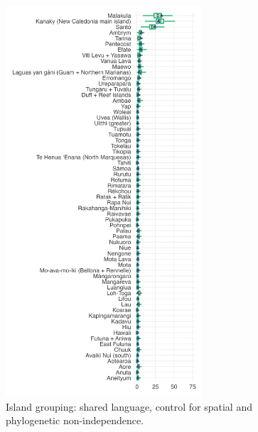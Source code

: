 \documentclass[unnumsec,webpdf,modern,medium]{oup-authoring-template}
\begin{document}
\begin{figure}[ht]
\includegraphics[width=0.65\textwidth]{brms_predict_medium_control_spatialphylo.png}
\caption{Island grouping: shared language,  control for spatial and phylogenetic non-independence.}
\label{brms_predict_medium_control_spatialphylo}
\end{figure}
\end{document}
